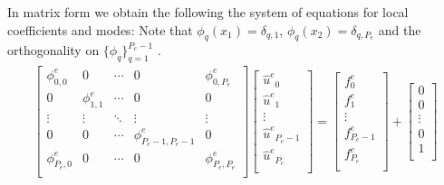 In matrix form we obtain the following the system of equations for local coefficients and modes:
Note that $\phi_q(x_1) = \delta_{q,1}$, $\phi_q(x_2) = \delta_{q, P_e}$ and the orthogonality on $\{\phi_q\}_{q=1}^{P_e-1}$ .
\begin{eqnarray}
\label{localsystem}
\begin{bmatrix}
    \phi_{0,0}^e   & 0            & \cdots & 0                    & \phi_{0,P_e}^e      \\
    0              & \phi_{1,1}^e & \cdots & 0                    & 0                   \\
    \vdots         & \vdots       & \ddots & \vdots               & \vdots              \\
    0              & 0            & \cdots & \phi_{P_e-1,P_e-1}^e & 0                   \\
    \phi_{P_e,0}^e & 0            & \cdots & 0                    & \phi_{P_e,P_e}^e    \\
\end{bmatrix}
\begin{bmatrix}
    {\hat u^e}_{0}      \\
    {\hat u^e}_{1}      \\
    \vdots              \\
    {\hat u^e}_{P_e-1}  \\
    {\hat u^e}_{P_e}    \\
\end{bmatrix}
=
\begin{bmatrix}
    f^e_{0}     \\
    f^e_{1}     \\
    \vdots      \\
    f^e_{P_e-1} \\
    f^e_{P_e}   \\
\end{bmatrix}
+
\begin{bmatrix}
    0       \\
    0       \\
    \vdots  \\
    0       \\
    1       \\
\end{bmatrix}

\end{eqnarray}
